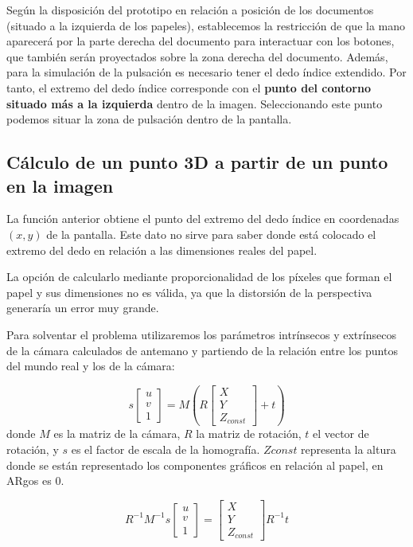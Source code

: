 Según la disposición del prototipo en relación a posición de los
documentos (situado a la izquierda de los papeles), establecemos la restricción de que la mano aparecerá por
la parte derecha del documento para interactuar con los botones, que
también serán proyectados sobre la zona derecha del documento. Además,
para la simulación de la pulsación es necesario tener el dedo índice
extendido. Por tanto, el extremo del dedo índice corresponde con el
 \textbf{punto del contorno situado más a la izquierda} dentro de la
imagen. Seleccionando este punto podemos situar la zona de pulsación
dentro de la pantalla.

\subsection{Cálculo de un punto 3D a partir de un punto en la imagen}
La función anterior obtiene el punto del extremo del dedo índice en
coordenadas $(x,y)$ de la pantalla. Este dato no sirve para saber
donde está colocado el extremo del dedo en relación a las
dimensiones reales del papel.

La opción de calcularlo mediante proporcionalidad de los píxeles que
forman el papel y sus dimensiones no es válida, ya que la distorsión
de la perspectiva generaría un error muy grande.

Para solventar el problema utilizaremos los parámetros intrínsecos y
extrínsecos de la cámara calculados de antemano y partiendo de la
relación entre los puntos del mundo real y los de la cámara:

\begin{equation}
s \begin{bmatrix}
u\\
v\\
1
\end{bmatrix} = M(R\begin{bmatrix}
X\\
Y\\
Z_{const}
\end{bmatrix}+t)
\end{equation}
donde $M$ es la matriz de la cámara, $R$ la matriz de rotación, $t$ el
vector de rotación, y $s$ es el factor de escala de la homografía. $Zconst$ representa la altura
donde se están representado los componentes gráficos en relación al
papel, en ARgos es 0.

\begin{equation}
R^{-1} M^{-1} s \begin{bmatrix}
u\\
v\\
1
\end{bmatrix} = \begin{bmatrix}
X\\
Y\\
Z_{const}
\end{bmatrix} R^{-1}t
\end{equation}

